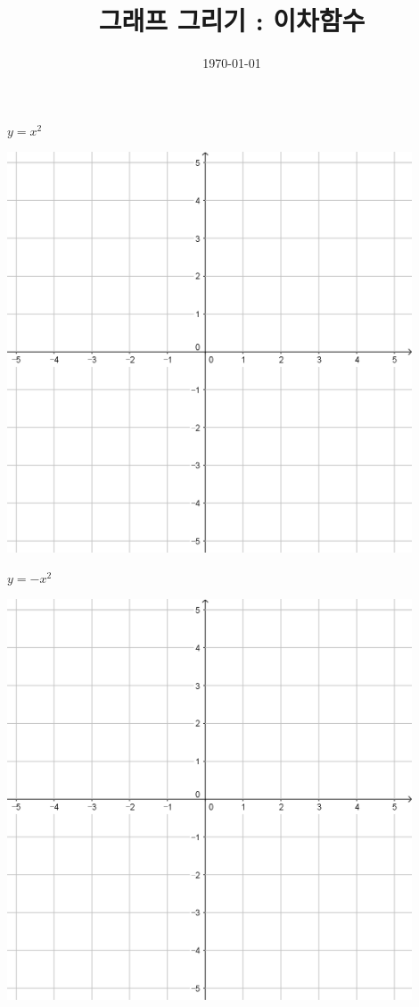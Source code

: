 \documentclass[a4paper]{oblivoir}
\title{그래프 그리기 : 이차함수}
\date{\today}
\author{}
\begin{document}
\maketitle

\begin{minipage}{0.45\textwidth}\centering
\(y=x^2\)
\par\bigskip\includegraphics[width=0.9\textwidth]{55}
\end{minipage}
\begin{minipage}{0.45\textwidth}\centering
\(y=-x^2\)
\par\bigskip\includegraphics[width=0.9\textwidth]{55}
\end{minipage}\bigskip\bigskip\par
\end{document}

